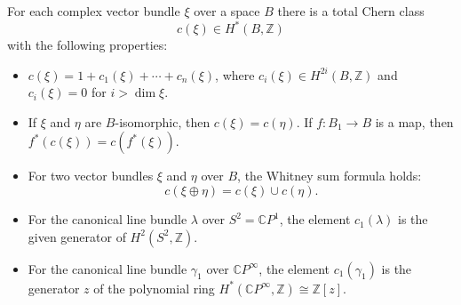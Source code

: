 For each complex vector bundle $\xi$ over a space $B$ there is a total Chern class
$$c(\xi) \in H^*(B, \mathbb{Z})$$
with the following properties:

\begin{itemize}
\item[(C$_0$)] $c(\xi) = 1 + c_1(\xi) + \cdots + c_n(\xi)$, where $c_i(\xi) \in H^{2i}(B, \mathbb{Z})$ and $c_i(\xi) = 0$ for $i > \dim \xi$.
\item[(C$_1$)] If $\xi$ and $\eta$ are $B$-isomorphic, then $c(\xi) = c(\eta)$. If $f: B_1 \to B$ is a map, then $f^*(c(\xi)) = c(f^*(\xi))$.
\item[(C$_2$)] For two vector bundles $\xi$ and $\eta$ over $B$, the Whitney sum formula holds:
$$c(\xi \oplus \eta) = c(\xi) \cup c(\eta).$$
\item[(C$_3$)] For the canonical line bundle $\lambda$ over $S^2 = \mathbb{C}P^1$, the element $c_1(\lambda)$ is the given generator of $H^2(S^2, \mathbb{Z})$.
\item[(C$'_3$)] For the canonical line bundle $\gamma_1$ over $\mathbb{C}P^\infty$, the element $c_1(\gamma_1)$ is the generator $z$ of the polynomial ring $H^*(\mathbb{C}P^\infty, \mathbb{Z}) \cong \mathbb{Z}[z]$.
\end{itemize}
